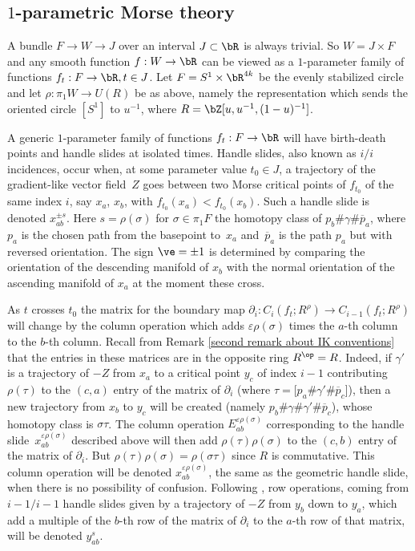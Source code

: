 \subsection{$1$-parametric Morse theory}

A bundle $F\to W\to J$ over an interval $J\subset \bR$ is always trivial. So $W=J\times F$ and any smooth function $f:W\to\bR$ can be viewed as a $1$-parameter family of functions $f_t:F\to\bR, t\in J$. Let $F=S^1\times \bR^{4k}$ be the evenly stabilized circle and let $\rho:\pi_1W \to U(R)$ be as above, namely the representation which sends the oriented circle $[S^1]$ to $u^{-1}$, where $R=\bZ[u,u^{-1},(1-u)^{-1}]$.

A generic $1$-parameter family of functions $f_t:F\to \bR$ will have birth-death points and handle slides at isolated times. Handle slides, also known as $i/i$ incidences, occur when, at some parameter value $t_0 \in J$, a trajectory of the gradient-like vector field~$Z$ goes between two Morse critical points of $f_{t_0}$ of the same index $i$, say $x_a$, $x_b$, with $f_{t_0}(x_a)<f_{t_0}(x_b)$. Such a handle slide is denoted $x_{ab}^{\pm s}$. Here $s=\rho(\sigma)$ for $\sigma\in \pi_1 F$ the homotopy class of $p_b\# \gamma \# \overline {p}_a$, where $p_a$ is the chosen path from the basepoint to~$x_a$ and~$\overline{p}_a$ is the path $p_a$ but with reversed orientation. The sign $\ve=\pm 1$ is determined by comparing the orientation of the descending manifold of $x_b$ with the normal orientation of the ascending manifold of $x_a$ at the moment these cross.

As $t$ crosses $t_0$ the matrix for the boundary map $\partial_i:C_i(f_t;R^\rho)\to C_{i-1}(f_t;R^\rho)$ will change by the column operation which adds $\varepsilon \rho(\sigma)$ times the $a$-th column to the $b$-th column. Recall from Remark \ref{second remark about IK conventions} that the entries in these matrices are in the opposite ring $R^{\op}=R$. Indeed, if $\gamma'$ is a trajectory of $-Z$ from $x_a$ to a critical point $y_c$ of index $i-1$ contributing $\rho(\tau)$ to the $(c,a)$ entry of the matrix of $\partial_i$ (where $\tau=[p_a\# \gamma' \# \overline{p}_c$]), then a new trajectory from $x_b$ to $y_c$ will be created (namely $p_b\# \gamma\# \gamma' \# \overline{p}_c$), whose homotopy class is $\sigma\tau$. The column operation $E_{ab}^{\varepsilon \rho(\sigma)}$ corresponding to the handle slide~$x_{ab}^{\varepsilon\rho(\sigma)}$ described above will then add $\rho(\tau)\rho(\sigma)$ to the $(c,b)$ entry of the matrix of $\partial_i$. But $\rho(\tau)\rho(\sigma)=\rho(\sigma\tau)$ since $R$ is commutative. This column operation will be denoted $x_{ab}^{\varepsilon\rho(\sigma)}$, the same as the geometric handle slide, when there is no possibility of confusion. Following \cite{IK93}, row operations, coming from $i-1/i-1$ handle slides given by a trajectory of $-Z$ from $y_b$ down to $y_a$, which add a multiple of the $b$-th row of the matrix of $\partial_i$ to the $a$-th row of that matrix, will be denoted $y_{ab}^s$.

